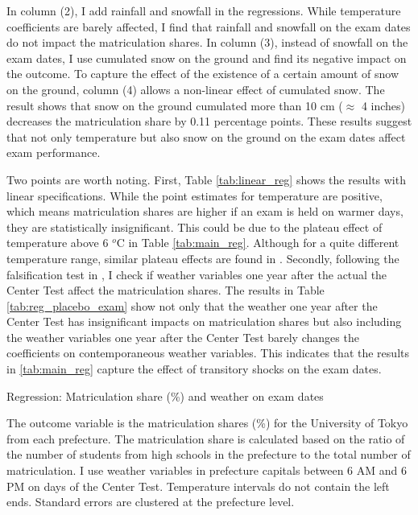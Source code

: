 \documentclass[12pt,letterpaper]{article}
\begin{document}
In column (2), I add rainfall and snowfall in the regressions.
While temperature coefficients are barely affected, I find that rainfall and snowfall on the exam dates do not impact the matriculation shares.
In column (3), instead of snowfall on the exam dates, I use cumulated snow on the ground and find its negative impact on the outcome. 
To capture the effect of the existence of a certain amount of snow on the ground, column (4) allows a non-linear effect of cumulated snow.
The result shows that snow on the ground cumulated more than 10 cm ($\approx$ 4 inches) decreases the matriculation share by 0.11 percentage points.
These results suggest that not only temperature but also snow on the ground on the exam dates affect exam performance.

Two points are worth noting.
First, Table \ref{tab:linear_reg} shows the results with linear specifications.
While the point estimates for temperature are positive, which means matriculation shares are higher if an exam is held on warmer days, they are statistically insignificant. 
This could be due to the plateau effect of temperature above 6 $^o$C in Table \ref{tab:main_reg}.
Although for a quite different temperature range, similar plateau effects are found in \citet{Park2020a}.
Secondly, following the falsification test in \citet{Cho2017}, I check if weather variables one year after the actual the Center Test affect the matriculation shares.
The results in Table \ref{tab:reg_placebo_exam} show not only that the weather one year after the Center Test has insignificant impacts on matriculation shares but also including the weather variables one year after the Center Test barely changes the coefficients on contemporaneous weather variables.
This indicates that the results in \ref{tab:main_reg} capture the effect of transitory shocks on the exam dates.

\begin{table}[H]
  \center
  \caption{Regression: Matriculation share (\%) and weather on exam dates}
  \footnotesize
  
  \label{tab:main_reg}
  \small
  \begin{tablenotes}
    \item
      The outcome variable is the matriculation shares (\%) for the University of Tokyo from each prefecture.
      The matriculation share is calculated based on the ratio of the number of students from high schools in the prefecture to the total number of matriculation.
      I use weather variables in prefecture capitals between 6 AM and 6 PM on days of the Center Test.
      Temperature intervals do not contain the left ends.
      Standard errors are clustered at the prefecture level.
  \end{tablenotes}
\end{table}
\end{document}
